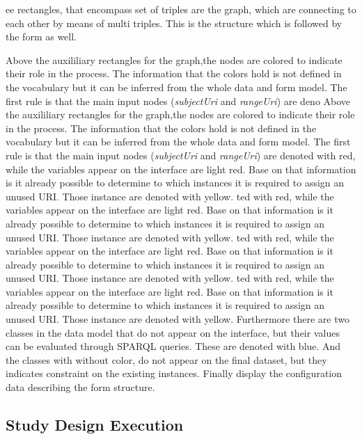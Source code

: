 ee rectangles, that encompass set of triples are the graph, which are connecting to each other by means of multi triples. This is the structure which is followed by the form as well.


Above the auxililiary rectangles for the graph,the nodes are colored to indicate their role in the process. The information that the colors hold is not defined in the vocabulary but it can be inferred from the whole data and form model. The first rule is that the main input nodes (\textit{subjectUri} and \textit{rangeUri}) are deno
Above the auxililiary rectangles for the graph,the nodes are colored to indicate their role in the process. The information that the colors hold is not defined in the vocabulary but it can be inferred from the whole data and form model. The first rule is that the main input nodes (\textit{subjectUri} and \textit{rangeUri}) are denoted with red, while the variables appear on the interface are light red. Base on that information is it already possible to determine to which instances it is required to assign an unused URI. Those instance are denoted with yellow.
ted with red, while the variables appear on the interface are light red. Base on that information is it already possible to determine to which instances it is required to assign an unused URI. Those instance are denoted with yellow.
ted with red, while the variables appear on the interface are light red. Base on that information is it already possible to determine to which instances it is required to assign an unused URI. Those instance are denoted with yellow.
ted with red, while the variables appear on the interface are light red. Base on that information is it already possible to determine to which instances it is required to assign an unused URI. Those instance are denoted with yellow.
Furthermore there are two classes in the data model that do not appear on the interface, but their values can be evaluated through SPARQL queries. These are denoted with blue. And the classes with without color, do not appear on the final dataset, but they indicates constraint on the existing instances.
Finally  display the configuration data describing the form structure. 


\subsection{Study Design Execution} \label{43}


